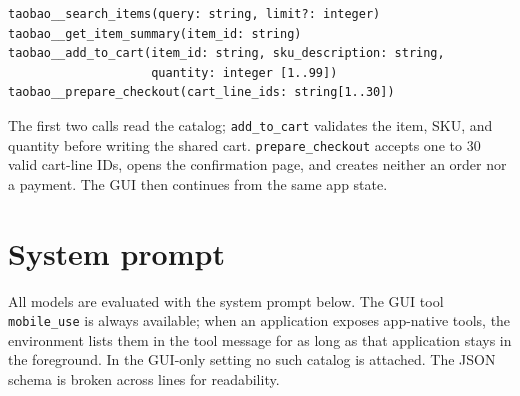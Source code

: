 \begin{lstlisting}[basicstyle=\ttfamily\small,frame=single,breaklines=true]
taobao__search_items(query: string, limit?: integer)
taobao__get_item_summary(item_id: string)
taobao__add_to_cart(item_id: string, sku_description: string,
                    quantity: integer [1..99])
taobao__prepare_checkout(cart_line_ids: string[1..30])
\end{lstlisting}

The first two calls read the catalog; \texttt{add\_to\_cart} validates the item, SKU, and quantity before writing the shared cart. \texttt{prepare\_checkout} accepts one to 30 valid cart-line IDs, opens the confirmation page, and creates neither an order nor a payment. The GUI then continues from the same app state.

\section{System prompt}
\label{app:sys-prompt}
All models are evaluated with the system prompt below. The GUI tool \texttt{mobile\_use} is always available; when an application exposes app-native tools, the environment lists them in the tool message for as long as that application stays in the foreground. In the GUI-only setting no such catalog is attached. The JSON schema is broken across lines for readability.

